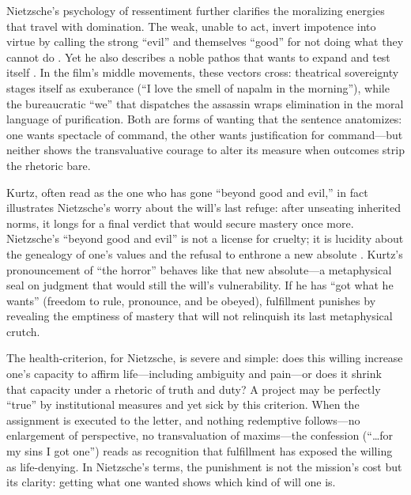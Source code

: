 Nietzsche's psychology of ressentiment further clarifies the moralizing energies that travel
with domination. The weak, unable to act, invert impotence into virtue by calling the strong
``evil'' and themselves ``good'' for not doing what they cannot do
. Yet he also describes a noble pathos that wants
to expand and test itself \parencite[\S\S 260--265]{NietzscheBGE1990}. In the film's middle
movements, these vectors cross: theatrical sovereignty stages itself as exuberance
(``I love the smell of napalm in the morning''), while the bureaucratic ``we'' that dispatches
the assassin wraps elimination in the moral language of purification. Both are forms of wanting
that the sentence anatomizes: one wants spectacle of command, the other wants justification for
command—but neither shows the transvaluative courage to alter its measure when outcomes strip
the rhetoric bare.

Kurtz, often read as the one who has gone ``beyond good and evil,'' in fact illustrates
Nietzsche's worry about the will's last refuge: after unseating inherited norms, it longs for
a final verdict that would secure mastery once more. Nietzsche's ``beyond good and evil'' is
not a license for cruelty; it is lucidity about the genealogy of one's values and the refusal
to enthrone a new absolute \parencite[\S\S 259--260]{NietzscheBGE1990}. Kurtz's pronouncement
of ``the horror'' behaves like that new absolute—a metaphysical seal on judgment that would
still the will's vulnerability. If he has ``got what he wants'' (freedom to rule, pronounce,
and be obeyed), fulfillment punishes by revealing the emptiness of mastery that will not
relinquish its last metaphysical crutch.

The health-criterion, for Nietzsche, is severe and simple: does this willing increase one's
capacity to affirm life—including ambiguity and pain—or does it shrink that capacity under a
rhetoric of truth and duty? A project may be perfectly ``true'' by institutional measures and
yet sick by this criterion. When the assignment is executed to the letter, and nothing
redemptive follows—no enlargement of perspective, no transvaluation of maxims—the confession
(``\ldots for my sins I got one'') reads as recognition that fulfillment has exposed the willing
as life-denying. In Nietzsche's terms, the punishment is not the mission's cost but its clarity:
getting what one wanted shows which kind of will one is.
